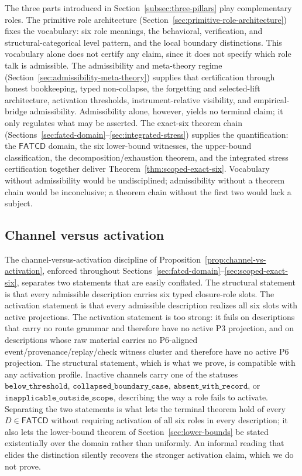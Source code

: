 \documentclass[11pt]{article}
\theoremstyle{definition}
\newcommand{\FATCD}{\ensuremath{\mathsf{FATCD}}}
\newcommand{\belowthr}{\texttt{below\_threshold}}
\newcommand{\collapsedbc}{\texttt{collapsed\_boundary\_case}}
\newcommand{\absentrec}{\texttt{absent\_with\_record}}
\newcommand{\outsidescope}{\texttt{inapplicable\_outside\_scope}}
\newcommand{\Pthree}{\ensuremath{\mathrm{P3}}}
\newcommand{\Psix}{\ensuremath{\mathrm{P6}}}
\begin{document}
The three parts introduced in Section~\ref{subsec:three-pillars} play
complementary roles. The primitive role architecture
(Section~\ref{sec:primitive-role-architecture}) fixes the vocabulary:
six role meanings, the behavioral, verification, and
structural-categorical level pattern, and the local boundary
distinctions. This vocabulary alone does not certify any claim,
since it does not specify which role talk is admissible. The
admissibility and meta-theory regime
(Section~\ref{sec:admissibility-meta-theory}) supplies that
certification through honest bookkeeping, typed non-collapse, the
forgetting and selected-lift architecture, activation thresholds,
instrument-relative visibility, and empirical-bridge admissibility.
Admissibility alone, however, yields no terminal claim; it only
regulates what may be asserted. The exact-six theorem chain
(Sections~\ref{sec:fatcd-domain}--\ref{sec:integrated-stress})
supplies the quantification: the \FATCD{} domain, the six
lower-bound witnesses, the upper-bound classification, the
decomposition/exhaustion theorem, and the integrated stress
certification together deliver Theorem~\ref{thm:scoped-exact-six}.
Vocabulary without admissibility would be undisciplined; admissibility
without a theorem chain would be inconclusive; a theorem chain without
the first two would lack a subject.

\subsection{Channel versus activation}\label{subsec:discussion-channel-vs-activation}

The channel-versus-activation discipline of
Proposition~\ref{prop:channel-vs-activation}, enforced throughout
Sections~\ref{sec:fatcd-domain}--\ref{sec:scoped-exact-six},
separates two statements that are easily conflated. The structural
statement is that every admissible description carries six typed
closure-role slots. The activation statement is that every admissible
description realizes all six slots with active projections. The
activation statement is too strong: it fails on descriptions that
carry no route grammar and therefore have no active \Pthree{}
projection, and on descriptions whose raw material carries no
\Psix{}-aligned event/provenance/replay/check witness cluster and
therefore have no active \Psix{} projection. The structural
statement, which is what we prove, is compatible with any activation
profile. Inactive channels carry one of the statuses
\(\belowthr{}\), \(\collapsedbc{}\), \(\absentrec{}\), or
\(\outsidescope{}\), describing the way a role fails to activate.
Separating the two statements is what lets the terminal theorem hold
of every \(D \in \FATCD{}\) without requiring activation of all six
roles in every description; it also lets the lower-bound theorem of
Section~\ref{sec:lower-bounds} be stated existentially over the
domain rather than uniformly. An informal reading that elides the
distinction silently recovers the stronger activation claim, which we
do not prove.
\end{document}
